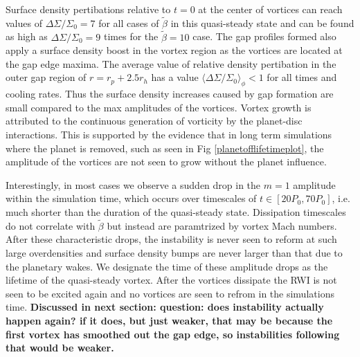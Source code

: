 Surface density pertibations relative to $t=0$
at the center of vortices can reach values of $\Delta\Sigma/\Sigma_0=7$ 
for all cases of $\tilde\beta$ in this quasi-steady state and
can be found as high as $\Delta\Sigma/\Sigma_0= 9$ times for the 
$\tilde\beta=10$ case. 
The gap profiles formed also apply a surface density boost in the vortex 
region as the vortices are located at the gap edge maxima.
The average value of relative density pertibation in the outer gap region of 
$r=r_{p}+2.5r_h$
has a value $\langle\Delta\Sigma/\Sigma_0\rangle_\phi<1$ for all times and
cooling rates.
Thus the surface density increases caused by gap formation are small 
compared to the max amplitudes of the vortices.
Vortex growth is attributed to
the continuous generation of vorticity by the planet-disc interactions. 
This is supported by the evidence that in long term simulations where the
planet is removed, such as seen in Fig \ref{planetofflifetimeplot},
the amplitude of
the vortices are not seen to grow without the planet influence.



Interestingly, in most cases we observe a sudden drop in 
the $m=1$ amplitude within the simulation time, which occurs over
timescales of $t\in[20P_0,70P_0]$, i.e. much shorter than the duration of the
quasi-steady state. Dissipation timescales do not correlate with $\tilde\beta$
 but instead are paramtrized by vortex Mach numbers.
After these characteristic drops, the instability is never seen to
reform at such large overdensities and surface density bumps are never larger
than that due to the planetary wakes. We designate the time of these
amplitude drops as the lifetime 
of the quasi-steady vortex.
After the vortices dissipate the RWI is not seen to be excited again and no
vortices are seen to refrom in the simulations time.
{\bf Discussed in next section:  question: does instability
  actually happen again? if it does, but just weaker, that may be
  because the first vortex has smoothed out the gap edge, so
  instabilities following that would be weaker.}



